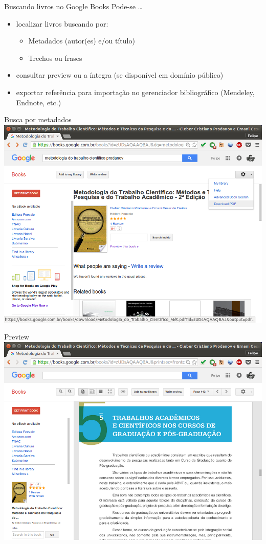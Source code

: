 \documentclass{beamer}
\begin{document}
\begin{frame}{Buscando livros no Google Books}
  Pode-se \ldots
  \begin{itemize}
    \footnotesize
  \item localizar livros buscando por:
    \begin{itemize}
      \scriptsize
    \item Metadados (autor(es) e/ou título)
    \item Trechos ou frases
    \end{itemize}
  \item consultar preview ou a íntegra (se disponível em domínio
    público)
  \item \alert{exportar} referência para \alert{importação} no
    gerenciador bibliográfico (Mendeley, Endnote, etc.)
  \end{itemize}
\end{frame}

\begin{frame}{Busca por metadados}
  \centering
  \includegraphics[height=.85\textheight]{Busca/gbooks-livro}
\end{frame}

\begin{frame}{Preview}
  \includegraphics[height=.85\textheight]{Busca/gbooks-preview}
\end{frame}
\end{document}
